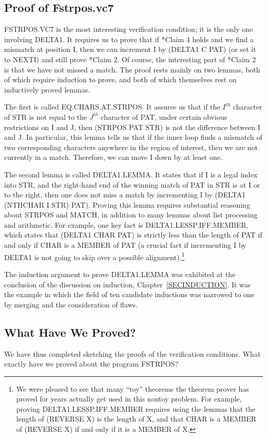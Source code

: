 \documentclass[10pt]{book}
\begin{document}
\subsection{Proof of Fstrpos.vc7}
FSTRPOS.VC7 is the most interesting verification condition;
it is the only one involving DELTA1.  It requires us to prove
that if *Claim 4 holds and we find a mismatch at position I, then
we can increment I by (DELTA1 C PAT) (or set it to NEXTI) and still prove *Claim 2.
Of course, the interesting part of *Claim 2 is that we have not
missed a match.
The proof rests mainly on two lemmas, both of
which require induction to prove, and both of which themselves
rest on inductively proved lemmas.

The first is called EQ.CHARS.AT.STRPOS.
It assures us that if the $I^{th}$ character of STR is not equal to the
$J^{th}$ character of PAT, under certain obvious restrictions on I and J,
then (STRPOS PAT STR) is not
the difference between I and J.  In particular, this lemma tells us
that if the inner loop finds a mismatch of two corresponding characters anywhere in the
region of interest, then we are not currently in a match.  Therefore, we can move I down
by at least one.

The second lemma is called DELTA1.LEMMA.
It states that if I is a legal index into STR,
and the right-hand end of the winning match of PAT in STR is at I or to the right,
then one does not miss a match by incrementing I
by (DELTA1 (NTHCHAR I STR) PAT).
Proving this lemma requires substantial reasoning about STRPOS and
MATCH, in addition to many lemmas about list processing
and arithmetic.  For example, one key fact
is DELTA1.LESSP.IFF.MEMBER, which states that (DELTA1 CHAR PAT) is strictly
less than the length of PAT if and only if CHAR is a MEMBER of PAT (a crucial
fact if incrementing I by DELTA1 is not going to skip over
a possible alignment).\footnote{We were pleased to see that many ``toy'' theorems the theorem prover has proved for years actually get used in this nontoy problem. For example, proving DELTA1.LESSP.IFF.MEMBER requires using the lemmas that the length of (REVERSE X) is the length of X, and that CHAR is a MEMBER of (REVERSE X) if and only if it is a MEMBER of X.}

The induction argument to prove DELTA1.LEMMA was exhibited
at the conclusion of the discussion on induction, Chapter~\ref{SECINDUCTION}.
It was the example in which the field of ten candidate inductions was
narrowed to one by merging and the consideration of flaws.

\subsection{What Have We Proved?}
We have thus completed sketching the proofs of the verification
conditions.  What exactly have we proved about the program FSTRPOS?
\end{document}
